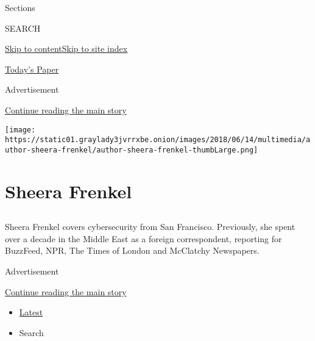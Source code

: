 Sections

SEARCH

\protect\hyperlink{site-content}{Skip to
content}\protect\hyperlink{site-index}{Skip to site index}

\href{https://myaccount.nytimes3xbfgragh.onion/auth/login?response_type=cookie\&client_id=vi}{}

\href{https://www.nytimes3xbfgragh.onion/section/todayspaper}{Today's
Paper}

Advertisement

\protect\hyperlink{after-top}{Continue reading the main story}

\texttt{[image: https://static01.graylady3jvrrxbe.onion/images/2018/06/14/multimedia/author-sheera-frenkel/author-sheera-frenkel-thumbLarge.png]}

\hypertarget{sheera-frenkel}{%
\section{Sheera Frenkel}\label{sheera-frenkel}}

\hypertarget{section}{%
\subsection{}\label{section}}

Sheera Frenkel covers cybersecurity from San Francisco. Previously, she
spent over a decade in the Middle East as a foreign correspondent,
reporting for BuzzFeed, NPR, The Times of London and McClatchy
Newspapers.

Advertisement

\protect\hyperlink{after-mid1}{Continue reading the main story}

\begin{itemize}
\tightlist
\item
  \protect\hyperlink{stream-panel}{Latest}
\item
  Search
\end{itemize}

